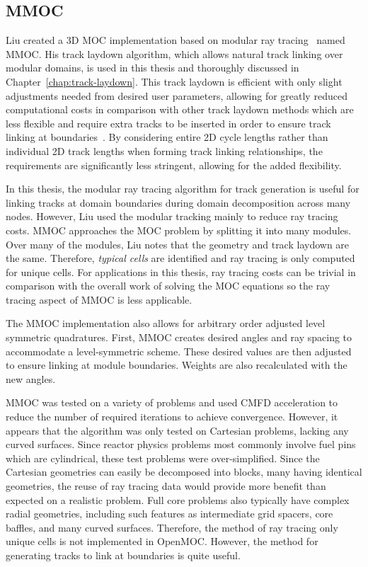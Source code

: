 \subsection{MMOC}
\label{sec:mmoc}

Liu created a 3D \ac{MOC} implementation based on modular ray tracing~\cite{liu_mrt} named MMOC. His track laydown algorithm, which allows natural track linking over modular domains, is used in this thesis and thoroughly discussed in Chapter~\ref{chap:track-laydown}. This track laydown is efficient with only slight adjustments needed from desired user parameters, allowing for greatly reduced computational costs in comparison with other track laydown methods which are less flexible and require extra tracks to be inserted in order to ensure track linking at boundaries~\cite{shaner-laydown}. By considering entire 2D cycle lengths rather than individual 2D track lengths when forming track linking relationships, the requirements are significantly less stringent, allowing for the added flexibility.

In this thesis, the modular ray tracing algorithm for track generation is useful for linking tracks at domain boundaries during domain decomposition across many nodes. However, Liu used the modular tracking mainly to reduce ray tracing costs. MMOC approaches the \ac{MOC} problem by splitting it into many modules. Over many of the modules, Liu notes that the geometry and track laydown are the same. Therefore, \textit{typical cells} are identified and ray tracing is only computed for unique cells. For applications in this thesis, ray tracing costs can be trivial in comparison with the overall work of solving the \ac{MOC} equations so the ray tracing aspect of MMOC is less applicable.

The MMOC implementation also allows for arbitrary order adjusted level symmetric quadratures. First, MMOC creates desired angles and ray spacing to accommodate a level-symmetric scheme. These desired values are then adjusted to ensure linking at module boundaries. Weights are also recalculated with the new angles.

MMOC was tested on a variety of problems and used \ac{CMFD} acceleration to reduce the number of required iterations to achieve convergence.  However, it appears that the algorithm was only tested on Cartesian problems, lacking any curved surfaces. Since reactor physics problems most commonly involve fuel pins which are cylindrical, these test problems were over-simplified. Since the Cartesian geometries can easily be decomposed into blocks, many having identical geometries, the reuse of ray tracing data would provide more benefit than expected on a realistic problem. Full core problems also typically have complex radial geometries, including such features as intermediate grid spacers, core baffles, and many curved surfaces. Therefore, the method of ray tracing only unique cells is not implemented in OpenMOC. However, the method for generating tracks to link at boundaries is quite useful.

